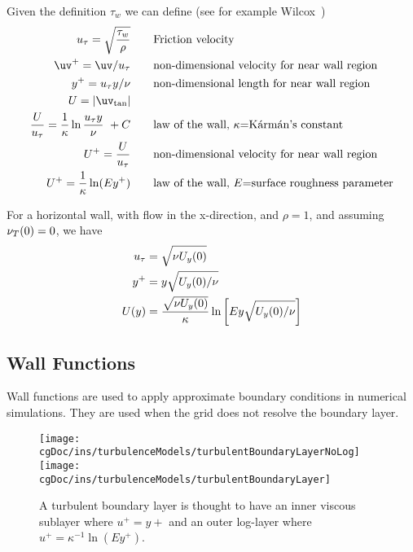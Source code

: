 Given the definition $\tau_w$ we can define (see for example Wilcox~\cite{Wilcox})
\begin{align*}
     u_\tau = \sqrt{ \tau_w \over \rho }  &\qquad  \mbox{Friction velocity} \\
     \uv^+ = \uv/u_\tau    & \qquad \mbox{non-dimensional velocity for near wall region} \\
     y^+ = u_\tau y/\nu  & \qquad \mbox{non-dimensional length for near wall region} \\
      U = \vert \uv_{\rm tan} \vert  & \\
  {U\over u_\tau} = {1\over\kappa} \ln {u_\tau y\over\nu} ~+C &\qquad 
             \mbox{law of the wall, $\kappa$=K\'arm\'an's constant} \\
   U^+ = {U\over u_\tau} &\qquad \mbox{non-dimensional velocity for near wall region} \\
   U^+ = {1\over\kappa} \ln( E y^+)  & \qquad \mbox{law of the wall, $E$=surface roughness parameter} \\
\end{align*}

For a horizontal wall, with flow in the x-direction, and $\rho=1$, and assuming $\nu_T(0)=0$, 
we have
\begin{align*}
  u_\tau &= \sqrt{ \nu  U_y(0)} \\
  y^+ &= y \sqrt{ U_y(0)/\nu } \\
  U(y) &= {\sqrt{ \nu U_y(0)} \over\kappa} \ln\left[ E y \sqrt{U_y(0)/\nu} \right]
\end{align*}


\subsection{Wall Functions}\label{sec:WallFunctions}
\newcommand{\uTau}{u_\tau} %
\newcommand{\OmegaWallLaw}{\Omega_{\rm wall-law}}

Wall functions are used to apply approximate boundary conditions in numerical simulations.
They are used when the grid does not resolve the boundary layer. 

\begin{figure}
\begin{center}
  \texttt{[image: \\cgDoc/ins/turbulenceModels/turbulentBoundaryLayerNoLog]}
  \texttt{[image: \\cgDoc/ins/turbulenceModels/turbulentBoundaryLayer]}
\end{center}
\caption{A turbulent boundary layer is thought to have an inner viscous sublayer where $u^+=y+$
  and an outer log-layer where $u^+ = \kappa^{-1}\ln(E y^+)$.}
\label{fig:turbulentBoundaryLayer}
\end{figure}


